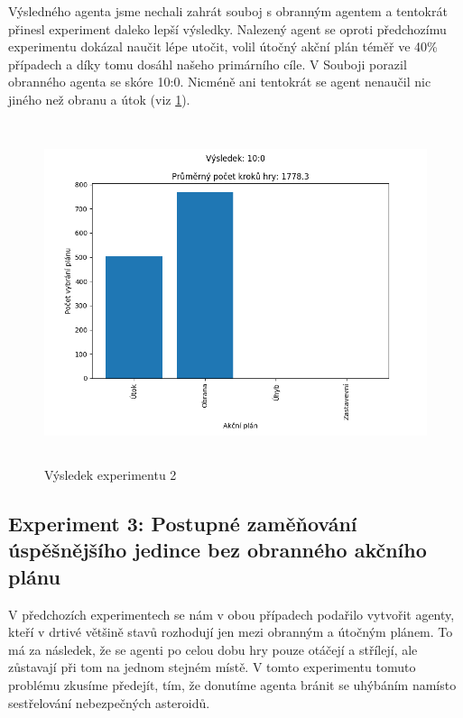 Výsledného agenta jsme nechali zahrát souboj s obranným agentem a tentokrát přinesl experiment daleko lepší výsledky.
Nalezený agent se oproti předchozímu experimentu dokázal naučit lépe utočit, volil útočný akční plán téměř ve 40\% případech a díky tomu dosáhl našeho primárního cíle. V Souboji porazil obranného agenta se skóre 10:0.
Nicméně ani tentokrát se agent nenaučil nic jiného než obranu a útok (viz \ref{Výsledek experimentu 02}). 

\newpage

 


\begin{figure}[p]\centering
\includegraphics[width=125mm, height=100mm]{./Obrazky/Experiment02Results.png}
\caption{Výsledek experimentu 2}
\label{Výsledek experimentu 02}
\end{figure}




\newpage
\subsection{Experiment 3: Postupné zaměňování úspěšnějšího jedince bez obranného akčního plánu}

V předchozích experimentech se nám v obou případech podařilo vytvořit agenty, kteří v drtivé většině stavů rozhodují jen mezi obranným a útočným plánem.
To má za následek, že se agenti po celou dobu hry pouze otáčejí a střílejí, ale zůstavají při tom na jednom stejném místě.
V tomto experimentu tomuto problému zkusíme předejít, tím, že donutíme agenta bránit se uhýbáním namísto sestřelování nebezpečných asteroidů.

